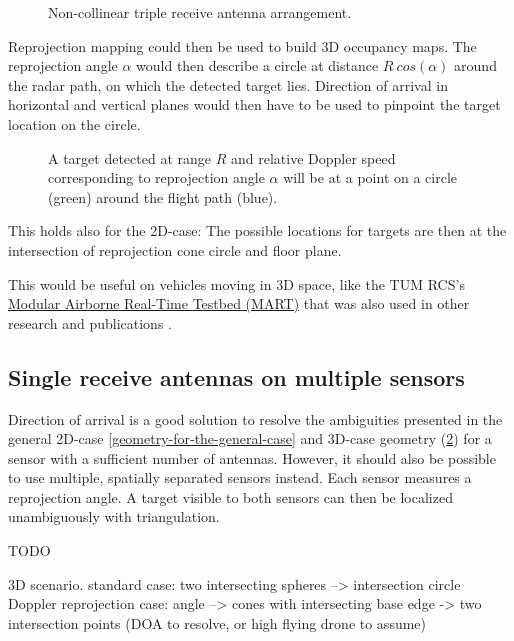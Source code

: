 \begin{figure}[htp]
    \centering
    \def\svgwidth{5cm}
    
    \caption{\label{fig:2ddoa}Non-collinear triple receive antenna arrangement.}
\end{figure}

Reprojection mapping could then be used to build 3D occupancy maps. The
reprojection angle \(\alpha\) would then describe a circle at distance
\(R~cos(\alpha)\) around the radar path, on which the detected target
lies. Direction of arrival in horizontal and vertical planes would then
have to be used to pinpoint the target location on the circle.

\begin{figure}[htp]
    \centering
    \def\svgwidth{5cm}
    
    \caption{\label{fig:3dcase}A target detected at range \(R\) and relative Doppler speed corresponding to reprojection angle \(\alpha\) will be at a point on a circle (green) around the flight path (blue).}
\end{figure}

This holds also for the 2D-case: The possible locations for targets are
then at the intersection of reprojection cone circle and floor plane.

This would be useful on vehicles moving in 3D space, like the TUM RCS's
\href{https://www.rcs.ei.tum.de/forschung/mart/}{Modular Airborne
Real-Time Testbed (MART)} that was also used in other research and
publications \cite{Becker2015}.

\subsection{Single receive antennas on multiple sensors}\label{single-receive-antennas-on-multiple-sensors}

Direction of arrival is a good solution to resolve the ambiguities
presented in the general 2D-case \cref{geometry-for-the-general-case} and 3D-case geometry (\cref{fig:3dcase}) for a
sensor with a sufficient number of antennas. However, it should also be
possible to use multiple, spatially separated sensors instead. Each
sensor measures a reprojection angle. A target visible to both sensors
can then be localized unambiguously with triangulation.

TODO

3D scenario. standard case: two intersecting spheres --\textgreater{}
intersection circle Doppler reprojection case: angle --\textgreater{}
cones with intersecting base edge -\textgreater{} two intersection
points (DOA to resolve, or high flying drone to assume)


